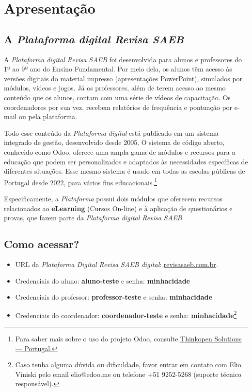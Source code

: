 \captionsetup{justification=raggedright, singlelinecheck=false}

\chapter{Apresentação}

\section{A \textit{Plataforma digital Revisa SAEB}}


A \textit{Plataforma digital Revisa SAEB} foi desenvolvida para alunos e
professores do 1º ao 9º ano do Ensino Fundamental. Por meio dela, os alunos
têm acesso às versões digitais do material impresso (apresentações PowerPoint), simulados 
por módulos, vídeos e jogos. Já os professores, além de terem acesso ao
mesmo conteúdo que os alunos, contam com uma série de vídeos de capacitação.
Os coordenadores por sua vez, recebem relatórios de frequência e pontuação por
e-mail ou pela plataforma.

Todo esse conteúdo da \textit{Plataforma digital} está publicado em um
sistema integrado de gestão, desenvolvido desde
2005. O sistema de código aberto, conhecido como Odoo, oferece uma ampla gama de módulos e
recursos para a educação que podem ser personalizados e adaptados às
necessidades específicas de diferentes situações. Esse mesmo sistema é usado
em todas as escolas públicas de Portugal desde 2022, para vários fins
educacionais.\footnote{ Para saber mais sobre o uso do projeto Odoo, consulte 
\href{https://www.odoo.com/pt_BR/partners/thinkopen-solutions-portugal-2614}{Thinkopen Solutions — Portugal.}}


Especificamente, a \textit{Plataforma} possui dois módulos que oferecem 
recursos relacionados ao \textbf{eLearning} (Cursos On-line) e 
à aplicação de questionários e provas, que fazem parte da \textit{Plataforma digital Revisa SAEB}.  




\section{Como acessar?} 

\begin{itemize}
\item URL da \textit{Plataforma Digital Revisa SAEB digital}:  \url{revisasaeb.com.br}.

\item Credenciais do aluno: \textbf{aluno-teste} e senha: \textbf{minhacidade}
\item Credenciais do professor: \textbf{professor-teste} e senha: \textbf{minhacidade}
\item Credenciais do coordenador: \textbf{coordenador-teste} e senha: \textbf
 {minhacidade}\footnote{ Caso tenha alguma dúvida ou dificuldade, favor
 entrar em contato com Elio Viniski pelo email elio@edoo.me ou
 telefone +51 9252-5268 (suporte técnico responsável). }
\end{itemize}

